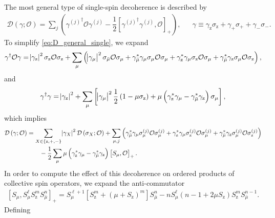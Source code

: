 \documentclass[aps,notitlepage,nofootinbib,11pt]{revtex4-1}
\newcommand{\f}[2]{\dfrac{#1}{#2}} %
\newcommand{\p}[1]{\left(#1\right)} %
\renewcommand{\sp}[1]{\left[#1\right]} %
\renewcommand{\set}[1]{\left\{#1\right\}} %
\newcommand{\D}{\mathcal{D}}
\renewcommand{\O}{\mathcal{O}}
\newcommand{\z}{\text{z}}
\newcommand{\bmu}{{\bar\mu}}
\newcommand{\1}{\mathds{1}}
\begin{document}
The most general type of single-spin decoherence is described by
\begin{align}
  \D\p{\gamma;\O}
  = \sum_j\p{{\gamma^{(j)}}^\dag \O \gamma^{(j)}
    - \f12\sp{{\gamma^{(j)}}^\dag \gamma^{(j)}, \O}_+},
  &&
  \gamma \equiv \gamma_\z \sigma_\z
  + \gamma_+ \sigma_+ + \gamma_- \sigma_-.
  \label{eq:D_general_single}
\end{align}
To simplify \eqref{eq:D_general_single}, we expand
\begin{align}
  \gamma^\dag \O \gamma
  = \abs{\gamma_\z}^2 \sigma_\z \O \sigma_\z
  + \sum_\mu \p{\abs{\gamma_\mu}^2 \sigma_\bmu \O \sigma_\mu
    + \gamma_\bmu^* \gamma_\mu \sigma_\mu \O \sigma_\mu
    + \gamma_\z^* \gamma_\mu \sigma_\z \O \sigma_\mu
    + \gamma_\bmu^* \gamma_\z \sigma_\mu \O \sigma_\z},
\end{align}
and
\begin{align}
  \gamma^\dag \gamma
  = \abs{\gamma_\z}^2
  + \sum_\mu \sp{\abs{\gamma_\mu}^2 \f12 \p{1-\mu\sigma_\z}
    + \mu \p{\gamma_\z^*\gamma_\mu - \gamma_\bmu^*\gamma_\z}
    \sigma_\mu},
\end{align}
which implies
\begin{align}
  \D\p{\gamma;\O}
  &= \sum_{X\in\set{\z,+,-}} \abs{\gamma_X}^2 \D\p{\sigma_X;\O}
  + \sum_{\mu,j}
  \p{\gamma_\bmu^* \gamma_\mu \sigma_\mu^{(j)} \O \sigma_\mu^{(j)}
    + \gamma_\z^* \gamma_\mu \sigma_\z^{(j)} \O \sigma_\mu^{(j)}
    + \gamma_\bmu^* \gamma_\z \sigma_\mu^{(j)} \O \sigma_\z^{(j)}}
  \notag \\
  &\qquad -\f12 \sum_\mu \mu
  \p{\gamma_\z^*\gamma_\mu - \gamma_\bmu^*\gamma_\z} \sp{S_\mu, \O}_+.
\end{align}
In order to compute the effect of this decoherence on ordered products
of collective spin operators, we expand the anti-commutator
\begin{align}
  \sp{S_\mu, S_\mu^\ell S_\z^m S_\bmu^n}_+
  = S_\mu^{\ell+1} \sp{S_\z^m+\p{\mu+S_\z}^m} S_\bmu^n
  - n S_\mu^\ell \p{n-1+2\mu S_\z} S_\z^m S_\bmu^{n-1}.
\end{align}
Defining
\end{document}

